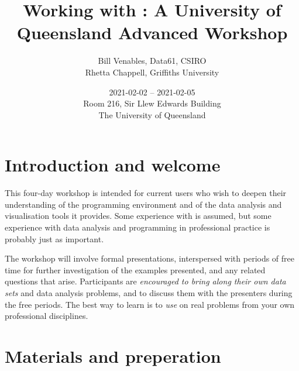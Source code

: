 \documentclass[12pt]{article}
\title{Working with \Rlogo:
  A University of Queensland Advanced Workshop}
\author{Bill Venables, Data61, CSIRO\\
Rhetta Chappell, Griffiths University}
\date{2021-02-02 -- 2021-02-05\\[10pt]
  Room 216, Sir Llew Edwards Building\\[5pt]
  The University of Queensland}
\begin{document}
\maketitle

\section{Introduction and welcome}
\label{sec:welcome}

This four-day workshop is intended for current \R users who wish to
deepen their understanding of the programming environment and of the
data analysis and visualisation tools it provides.  Some experience
with \R is assumed, but some experience with data analysis and
programming in professional practice is probably just as important.

The workshop will involve formal presentations, interspersed with
periods of free time for further investigation of the examples
presented, and any related questions that arise.  Participants are
\emph{encouraged to bring along their own data sets} and data analysis
problems, and to discuss them with the presenters during the free
periods.  The best way to learn \R is to \emph{use} \R on real
problems from your own professional disciplines.


\section{Materials and preperation}
\label{sec:prep}
\end{document}
